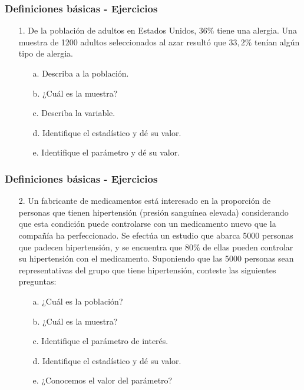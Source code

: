 \documentclass[10pt]{beamer}
\theoremstyle{plain} %
\theoremstyle{definition}
\theoremstyle{remark}
\begin{document}
\begin{frame}
\frametitle{Definiciones básicas - Ejercicios}
\begin{itemize}
\justifying
\item[1.]De la población de adultos en Estados Unidos,
$36\%$ tiene una alergia. Una muestra de 1200 adultos
seleccionados al azar resultó que $33{,}2\%$ tenían algún
tipo de alergia.\\
\begin{itemize}
\item[a.]Describa a la población.
\item[b.]¿Cuál es la muestra?
\item[c.]Describa la variable.
\item[d.]Identifique el estadístico y dé su valor.
\item[e.]Identifique el parámetro y dé su valor.
\end{itemize}
\end{itemize} 
\end{frame}


\begin{frame}
\frametitle{Definiciones básicas - Ejercicios}
\begin{itemize}
\justifying
\item[2.]Un fabricante de medicamentos está interesado
en la proporción de personas que tienen hipertensión
(presión sanguínea elevada) considerando que esta
condición puede controlarse con un medicamento
nuevo que la compañía ha perfeccionado. Se efectúa
un estudio que abarca 5000 personas que padecen hipertensión,
y se encuentra que $80\%$ de ellas pueden
controlar su hipertensión con el medicamento. Suponiendo
que las 5000 personas sean representativas del
grupo que tiene hipertensión, conteste las siguientes
preguntas:\\

\begin{itemize}
\item[a.]¿Cuál es la población?
\item[b.]¿Cuál es la muestra?
\item[c.]Identifique el parámetro de interés.
\item[d.]Identifique el estadístico y dé su valor.
\item[e.]¿Conocemos el valor del parámetro?
\end{itemize}
\end{itemize} 
\end{frame}
\end{document}
